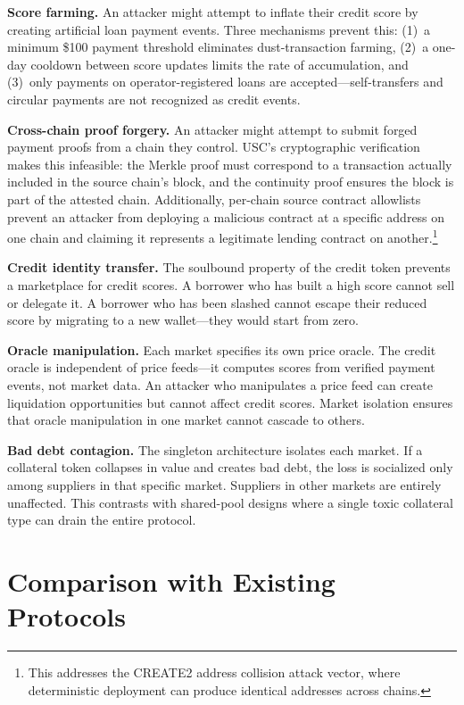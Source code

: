 \documentclass[11pt,a4paper]{article}
\begin{document}
\textbf{Score farming.} An attacker might attempt to inflate their credit score by creating artificial loan payment events. Three mechanisms prevent this: (1)~a minimum \$100 payment threshold eliminates dust-transaction farming, (2)~a one-day cooldown between score updates limits the rate of accumulation, and (3)~only payments on operator-registered loans are accepted---self-transfers and circular payments are not recognized as credit events.

\textbf{Cross-chain proof forgery.} An attacker might attempt to submit forged payment proofs from a chain they control. USC's cryptographic verification makes this infeasible: the Merkle proof must correspond to a transaction actually included in the source chain's block, and the continuity proof ensures the block is part of the attested chain. Additionally, per-chain source contract allowlists prevent an attacker from deploying a malicious contract at a specific address on one chain and claiming it represents a legitimate lending contract on another.\footnote{This addresses the CREATE2 address collision attack vector, where deterministic deployment can produce identical addresses across chains.}

\textbf{Credit identity transfer.} The soulbound property of the credit token prevents a marketplace for credit scores. A borrower who has built a high score cannot sell or delegate it. A borrower who has been slashed cannot escape their reduced score by migrating to a new wallet---they would start from zero.

\textbf{Oracle manipulation.} Each market specifies its own price oracle. The credit oracle is independent of price feeds---it computes scores from verified payment events, not market data. An attacker who manipulates a price feed can create liquidation opportunities but cannot affect credit scores. Market isolation ensures that oracle manipulation in one market cannot cascade to others.

\textbf{Bad debt contagion.} The singleton architecture isolates each market. If a collateral token collapses in value and creates bad debt, the loss is socialized only among suppliers in that specific market. Suppliers in other markets are entirely unaffected. This contrasts with shared-pool designs where a single toxic collateral type can drain the entire protocol.

\section{Comparison with Existing Protocols}
\end{document}
